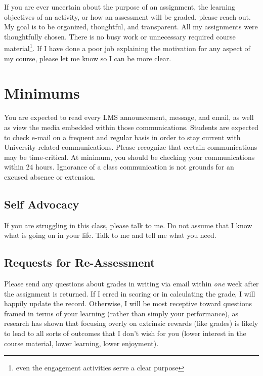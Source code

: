 \documentclass[
]{book}
\begin{document}
If you are ever uncertain about the purpose of an assignment, the learning objectives of an activity, or how an assessment will be graded, please reach out. My goal is to be organized, thoughtful, and transparent. All my assignments were thoughtfully chosen. There is no busy work or unnecessary required course material\footnote{even the engagement activities serve a clear purpose}. If I have done a poor job explaining the motivation for any aspect of my course, please let me know so I can be more clear.

\section{Minimums}\label{minimums}

You are expected to read every LMS announcement, message, and email, as well as view the media embedded within those communications. Students are expected to check e-mail on a frequent and regular basis in order to stay current with University-related communications. Please recognize that certain communications may be time-critical. At minimum, you should be checking your communications within 24 hours. Ignorance of a class communication is not grounds for an excused absence or extension.

\subsection{Self Advocacy}\label{self-advocacy-1}

If you are struggling in this class, please talk to me. Do not assume that I know what is going on in your life. Talk to me and tell me what you need.

\subsection{Requests for Re-Assessment}\label{requests-for-re-assessment}

Please send any questions about grades in writing via email within \emph{one} week after the assignment is returned. If I erred in scoring or in calculating the grade, I will happily update the record. Otherwise, I will be most receptive toward questions framed in terms of your learning (rather than simply your performance), as research has shown that focusing overly on extrinsic rewards (like grades) is likely to lead to all sorts of outcomes that I don't wish for you (lower interest in the course material, lower learning, lower enjoyment).
\end{document}
